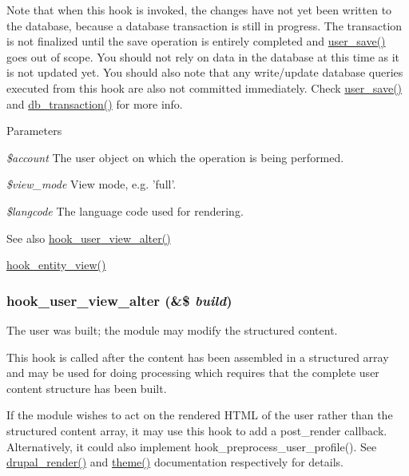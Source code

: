 Note that when this hook is invoked, the changes have not yet been written to the database, because a database transaction is still in progress. The transaction is not finalized until the save operation is entirely completed and \hyperlink{user_8module_a857b652072abb243e0b44b02c3746a99}{user\_\-save()} goes out of scope. You should not rely on data in the database at this time as it is not updated yet. You should also note that any write/update database queries executed from this hook are also not committed immediately. Check \hyperlink{user_8module_a857b652072abb243e0b44b02c3746a99}{user\_\-save()} and \hyperlink{group__database_gabdd0e69f5b2c63f8ad9e76f0fdf552be}{db\_\-transaction()} for more info.


\begin{DoxyParams}{Parameters}
\item[{\em \$account}]The user object on which the operation is being performed. \item[{\em \$view\_\-mode}]View mode, e.g. 'full'. \item[{\em \$langcode}]The language code used for rendering.\end{DoxyParams}
\begin{DoxySeeAlso}{See also}
\hyperlink{group__hooks_ga31a81ec1419afc31ebb77a9a86afe754}{hook\_\-user\_\-view\_\-alter()} 

\hyperlink{group__hooks_gae273ba271c2ef1192fe135afa9da5d49}{hook\_\-entity\_\-view()} 
\end{DoxySeeAlso}
\hypertarget{group__hooks_ga31a81ec1419afc31ebb77a9a86afe754}{
\subsubsection[{hook\_\-user\_\-view\_\-alter}]{\setlength{\rightskip}{0pt plus 5cm}hook\_\-user\_\-view\_\-alter (\&\$ {\em build})}}
\label{group__hooks_ga31a81ec1419afc31ebb77a9a86afe754}
The user was built; the module may modify the structured content.

This hook is called after the content has been assembled in a structured array and may be used for doing processing which requires that the complete user content structure has been built.

If the module wishes to act on the rendered HTML of the user rather than the structured content array, it may use this hook to add a post\_\-render callback. Alternatively, it could also implement hook\_\-preprocess\_\-user\_\-profile(). See \hyperlink{common_8inc_a05798b44e8d6c496d4bee5cc32fa7851}{drupal\_\-render()} and \hyperlink{includes_2theme_8inc_a7c25609a935874541a19657affd30fff}{theme()} documentation respectively for details.


